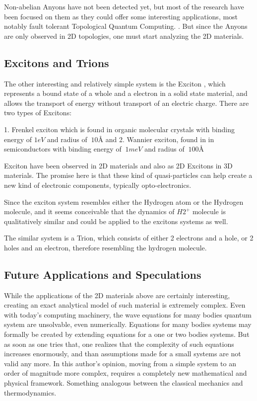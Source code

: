 Non-abelian Anyons have not been detected yet, but most of the research have been focused on them as  they could offer some interesting applications, most notably  fault tolerant Topological Quantum Computing. \cite{AnyonsTqc}. But since the Anyons are only observed in 2D topologies, one must start analyzing the 2D materials.


\subsection*{Excitons and Trions}

The other interesting and relatively simple system is the Exciton \cite{Excitons2D1}, which represents a bound state of a whole and a electron in a solid state material, and allows the transport of energy without transport of an electric charge. There are two types of Excitons: 

1. Frenkel exciton which is found in organic molecular crystals \cite{Excitons3} with binding energy of $ 1eV $ and radius of $ ~ 10\text{\AA} $ and 
2. Wannier exciton, found in in semiconductors \cite{Excitons2}  with binding energy of $ ~1meV $ and radius of $ ~100\text{\AA} $

Exciton have been observed in 2D materials \cite{Excitons2D2} and also as 2D Excitons in 3D materials. The promise here is that these kind of quasi-particles can help create a new kind of electronic components, typically opto-electronics.

Since the exciton system resembles either the Hydrogen atom or the Hydrogen molecule, and it seems conceivable that the dynamics of  $ H2^{+} $ molecule is qualitatively similar and could be applied to the excitons systems as well.

The similar system is a Trion, which consists of either 2 electrons and a hole, or 2 holes and an electron, therefore resembling the hydrogen molecule.

\subsection*{Future Applications and Speculations}

While the applications of the 2D materials above are certainly interesting, creating an exact analytical  model of such material is extremely complex. Even with today's computing machinery, the wave equations for many bodies quantum system are unsolvable, even numerically.  Equations for many bodies systems may formally be created by extending equations for a one or two bodies systems. But as soon as one tries that, one realizes that the complexity of such equations increases enormously, and than assumptions  made for a small systems are not valid any more. In this author's opinion, moving from a simple system to an order of magnitude more complex, requires a completely new mathematical and physical framework. Something analogous between the classical mechanics and thermodynamics.

